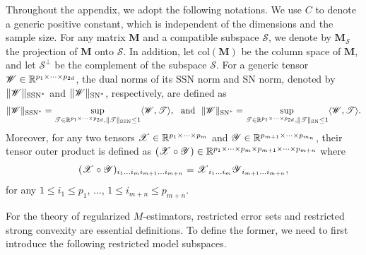 \documentclass[12pt]{article}
\newcommand{\bm}{\boldsymbol}
\newcommand{\cm}[1]{\mbox{\boldmath$\mathscr{#1}$}}
\begin{document}
Throughout the appendix, we adopt the following notations. We use $C$ to denote a generic positive constant, which is independent of the dimensions and the sample size.  For any matrix $\bm{M}$ and a compatible subspace $\mathcal{S}$, we denote by $\bm{M}_{\mathcal{S}}$ the projection of $\bm{M}$ onto $\mathcal{S}$. In addition, let $\text{col}(\bm{M})$ be the column space of $\bm{M}$, and let $\mathcal{S}^\perp$ be the complement of the subspace $\mathcal{S}$. For a generic tensor $\cm{W}\in\mathbb{R}^{p_1\times\cdots\times p_{2d}}$, the dual norms of its SSN norm and SN norm, denoted by $\|\cm{W}\|_{\text{SSN}^*}$ and $\|\cm{W}\|_{\text{SN}^*}$, respectively, are defined as
\begin{equation}
\begin{split}
\|\cm{W}\|_{\text{SSN}^*}=\sup_{\scalebox{0.7}{\cm{T}}\in\mathbb{R}^{p_1\times\cdots\times p_{2d}},\|\scalebox{0.7}{\cm{T}}\|_{\text{SSN}}\leq1}\langle\cm{W},\cm{T}\rangle,~~\text{and}~~\|\cm{W}\|_{\text{SN}^*}=\sup_{\scalebox{0.7}{\cm{T}}\in\mathbb{R}^{p_1\times\cdots\times p_{2d}},\|\scalebox{0.7}{\cm{T}}\|_{\text{SN}}\leq1}\langle\cm{W},\cm{T}\rangle.
\end{split}
\end{equation}
Moreover, for any two tensors $\cm{X}\in\mathbb{R}^{p_1\times\cdots\times p_m}$ and $\cm{Y}\in\mathbb{R}^{p_{m+1}\times\cdots\times p_{m_n}}$, their tensor outer product is defined as $(\cm{X}\circ\cm{Y})\in\mathbb{R}^{p_1\times\cdots\times p_m\times p_{m+1}\times\cdots\times p_{m+n}}$ where
\begin{equation}
(\cm{X}\circ\cm{Y})_{i_1\dots i_{m}i_{m+1}\dots i_{m+n}}=\cm{X}_{i_1\dots i_m}\cm{Y}_{i_{m+1}\dots i_{m+n}},
\end{equation}
for any $1\leq i_1\leq p_1$, $\dots$, $1\leq i_{m+n}\leq p_{m+n}$.

For the theory of regularized $M$-estimators, restricted error sets  and restricted strong convexity are essential definitions. To define the former, we need to first introduce the following restricted model subspaces.
\end{document}
